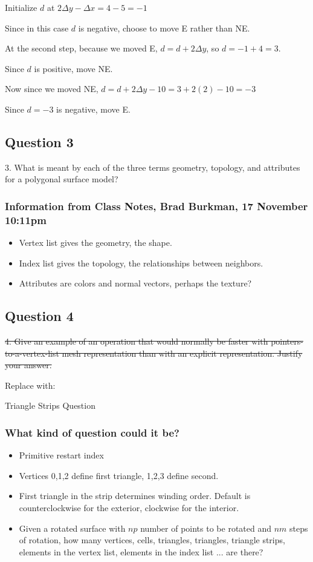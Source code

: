 \documentclass[11pt]{article}
\begin{document}
\begin{spacing}{1.2}
Initialize $d$ at $2\Delta y - \Delta x = 4-5 = -1$  

Since in this case $d$ is negative, choose to move E rather than NE.  

At the second step, because we moved E, $d = d+2\Delta y$, so $d = -1 + 4 = 3$.  

Since $d$ is positive, move NE.  

Now since we moved NE, $d = d+2 \Delta y - 10 = 3 + 2(2) - 10 = -3$

Since $d = -3$ is negative, move E.



\subsection{Question 3}
3.  What is meant by each of the three terms geometry, topology, and attributes for a polygonal surface model?

\subsubsection{Information from Class Notes, Brad Burkman, 17 November 10:11pm}

\begin{itemize}
	\item Vertex list gives the geometry, the shape.  
	\item Index list gives the topology, the relationships between neighbors.  
	\item Attributes are colors and normal vectors, perhaps the texture?
\end{itemize}

\subsection{Question 4}

\sout{4.  Give an example of an operation that would normally be faster with pointers-to-a-vertex-list mesh representation than with an explicit representation.  Justify your answer.  }

Replace with:

Triangle Strips Question

\subsubsection{What kind of question could it be?}

\begin{itemize}
	\item Primitive restart index
	\item Vertices 0,1,2 define first triangle, 1,2,3 define second. 
	\item First triangle in the strip determines winding order.  Default is counterclockwise for the exterior, clockwise for the interior.  
	\item Given a rotated surface with $np$ number of points to be rotated and $nm$ steps of rotation, how many vertices, cells, triangles, triangles, triangle strips, elements in the vertex list, elements in the index list ... are there?
\end{itemize}



\end{spacing}
\end{document}
